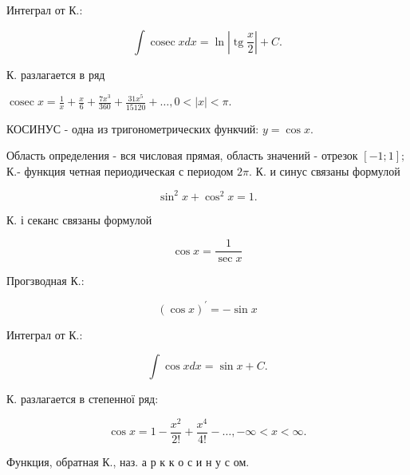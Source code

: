 \documentclass[10pt]{article}
\begin{document}
Интеграл от К.:



\[

\int \operatorname{cosec} x d x=\ln \left|\operatorname{tg} \frac{x}{2}\right|+C .

\]



К. разлагается в ряд



$\operatorname{cosec} x=\frac{1}{x}+\frac{x}{6}+\frac{7 x^{3}}{360}+\frac{31 x^{5}}{15120}+\ldots, 0<|x|<\pi$.



КОСИНУС - одна из тригонометрических функчий: $y=\cos x$.



Область определения - вся числовая прямая, область значений - отрезок $[-1 ; 1] ;$ К.- функция четная периодическая с периодом $2 \pi$. К. и синус связаны формулой



\[

\sin ^{2} x+\cos ^{2} x=1 .

\]



К. і секанс связаны формулой



\[

\cos x=\frac{1}{\sec x}

\]



Прогзводная К.:



\[

(\cos x)^{\prime}=-\sin x

\]



Интеграл от К.:



\[

\int \cos x d x=\sin x+C .

\]



К. разлагается в степенної ряд:



\[

\cos x=1-\frac{x^{2}}{2 !}+\frac{x^{4}}{4 !}-\ldots,-\infty<x<\infty .

\]



Функция, обратная К., наз. а р к к о с и н у с ом.
\end{document}
